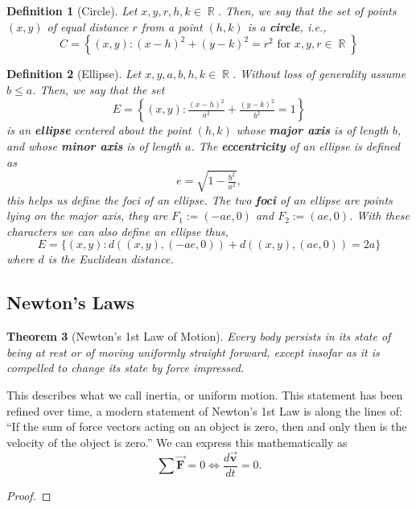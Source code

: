\documentclass[letterpaper, 12pt]{amsart}
\DeclareMathOperator{\R}{\mathbb{R}}				%
\newcommand{\bvec}[1]{{\vec{\mathbf{#1}}}}			%
\newtheorem{thm}{Theorem}[section]					%
\newtheorem{defn}[thm]{Definition}					%
\theoremstyle{definition}  							%
\begin{document}
		\begin{defn}[Circle]
			Let $x,y,r,h,k \in \R$.
			Then, we say that the set of points $(x,y)$ of equal distance $r$ from a point $(h,k)$ is a \textbf{circle}, i.e., $$C = \left\{ (x,y) : (x-h)^2 + (y-k)^2 = r^2 \text{ for $x,y,r \in \R$}\right\}$$ 
		\end{defn}

		\begin{defn}[Ellipse]
			Let $x,y,a,b,h,k \in \R$.
			Without loss of generality assume $b \leq a$.
			Then, we say that the set $$E = \left\{ (x,y) : \tfrac{(x-h)^2}{a^2} + \tfrac{(y-k)^2}{b^2} = 1 \right\}$$ is an \textbf{ellipse} centered about the point $(h,k)$ whose \textbf{major axis} is of length $b$, and whose \textbf{minor axis} is of length $a$.
			The \textbf{eccentricity} of an ellipse is defined as $$e = \sqrt{1 - \tfrac{b^2}{a^2}},$$ this helps us define the foci of an ellipse.
			The two \textbf{foci} of an ellipse are points lying on the major axis, they are $F_{1} := (-ae,0)$ and $F_{2} := (ae,0)$.
			With these characters we can also define an ellipse thus, $$E = \{ (x,y) : d((x,y),(-ae,0)) + d((x,y),(ae,0)) = 2a \}$$ where $d$ is the Euclidean distance.
		\end{defn}
	
		\subsection{Newton's Laws}
		\label{sub:newtons_laws}
			\begin{thm}[Newton's 1st Law of Motion]
			Every body persists in its state of being at rest or of moving uniformly straight forward, except insofar as it is compelled to change its state by force impressed.
			\end{thm}
			This describes what we call inertia, or uniform motion.
			This statement has been refined over time, a modern statement of Newton's 1st Law is along the lines of: ``If the sum of force vectors acting on an object is zero, then and only then is the velocity of the object is zero.''
			We can express this mathematically as $$\sum \bvec{F} = 0 \iff \frac{d\bvec{v}}{dt} = 0.$$

			\begin{proof}
			\end{proof}
\end{document}
